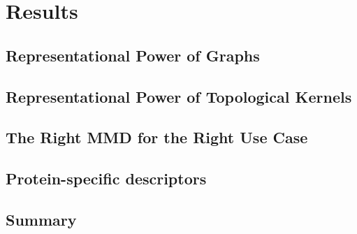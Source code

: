 \chapter{Results}

\section{Representational Power of Graphs}

\section{Representational Power of Topological Kernels}

\section{The Right MMD for the Right Use Case}

\section{Protein-specific descriptors}









\section{Summary}
